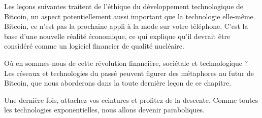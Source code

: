 Les leçons suivantes traitent de l'éthique du développement technologique de
Bitcoin, un aspect potentiellement aussi important que la technologie elle-même.
Bitcoin, ce n'est pas la prochaine appli à la mode sur votre téléphone. C'est la
base d'une nouvelle réalité économique, ce qui explique qu'il devrait être
considéré comme un logiciel financier de qualité nucléaire.

Où en sommes-nous de cette révolution financière, sociétale et technologique ?
Les réseaux et technologies du passé peuvent figurer des métaphores au futur de
Bitcoin, que nous aborderons dans la toute dernière leçon de ce chapitre.

Une dernière fois, attachez vos ceintures et profitez de la descente. Comme
toutes les technologies exponentielles, nous allons devenir paraboliques.
